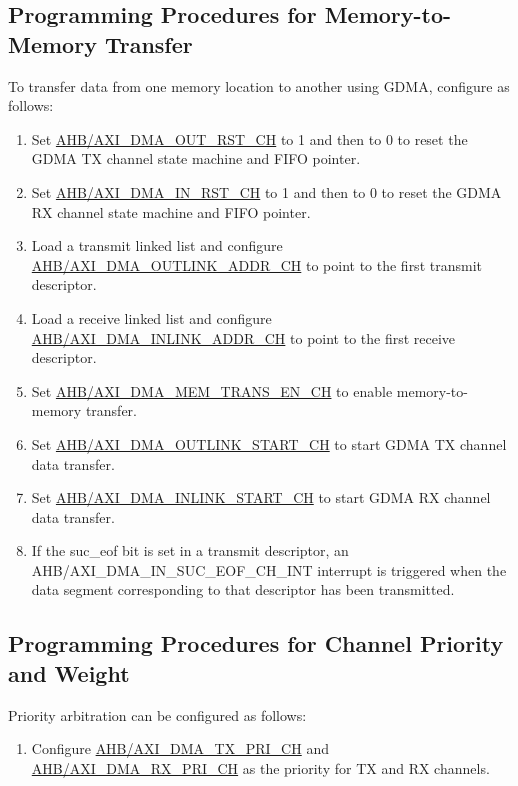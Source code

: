 \documentclass[main\_\_EN.tex]{subfiles}
\begin{document}
\subsection{Programming Procedures for Memory-to-Memory Transfer}
To transfer data from one memory location to another using GDMA, configure as follows:
\begin{enumerate}
    \item Set \hyperref[fielddesc:AHBDMAOUTRSTCHN]{AHB/AXI\_DMA\_OUT\_RST\_CH} to 1 and then to 0 to reset the GDMA TX channel state machine and FIFO pointer.
    \item Set \hyperref[fielddesc:AHBDMAINRSTCHN]{AHB/AXI\_DMA\_IN\_RST\_CH} to 1 and then to 0 to reset the GDMA RX channel state machine and FIFO pointer.
    \item Load a transmit linked list and configure \hyperref[fielddesc:AHBDMAOUTLINKADDRCHN]{AHB/AXI\_DMA\_OUTLINK\_ADDR\_CH} to point to the first transmit descriptor.
    \item Load a receive linked list and configure \hyperref[fielddesc:AHBDMAINLINKADDRCHN]{AHB/AXI\_DMA\_INLINK\_ADDR\_CH} to point to the first receive descriptor.
    \item Set \hyperref[fielddesc:AHBDMAMEMTRANSENCHN]{AHB/AXI\_DMA\_MEM\_TRANS\_EN\_CH} to enable memory-to-memory transfer.
    \item Set \hyperref[fielddesc:AHBDMAOUTLINKSTARTCHN]{AHB/AXI\_DMA\_OUTLINK\_START\_CH} to start GDMA TX channel data transfer.
    \item Set \hyperref[fielddesc:AHBDMAINLINKSTARTCHN]{AHB/AXI\_DMA\_INLINK\_START\_CH} to start GDMA RX channel data transfer.
    \item If the suc\_eof bit is set in a transmit descriptor, an AHB/AXI\_DMA\_IN\_SUC\_EOF\_CH\_INT interrupt is triggered when the data segment corresponding to that descriptor has been transmitted.
\end{enumerate}

\subsection{Programming Procedures for Channel Priority and Weight}

Priority arbitration can be configured as follows:
\begin{enumerate}
    \item Configure \hyperref[fielddesc:AHBDMATXPRICHN]{AHB/AXI\_DMA\_TX\_PRI\_CH} and \hyperref[fielddesc:AHBDMARXPRICHN]{AHB/AXI\_DMA\_RX\_PRI\_CH} as the priority for TX and RX channels.

\end{enumerate}
\end{document}
